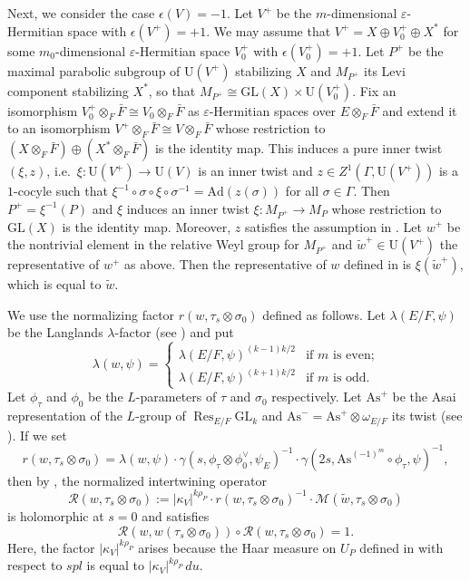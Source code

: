 \documentclass[11pt]{amsart}
\numberwithin{equation}{section}
\theoremstyle{plain}
\theoremstyle{definition}
\theoremstyle{remark}
\def\Res{\operatorname{Res}}
\def\Ad{\mathrm{Ad}}
\def\As{\mathrm{As}}
\def\GL{\mathrm{GL}}
\def\U{\mathrm{U}}
\def\spl{\boldsymbol{\mathit{spl}}}
\def\M{\mathcal{M}}
\def\R{\mathcal{R}}
\begin{document}
Next, we consider the case $\epsilon(V) = -1$.
Let $V^+$ be the $m$-dimensional $\varepsilon$-Hermitian space with $\epsilon(V^+) = +1$.
We may assume that $V^+ = X \oplus V_0^+ \oplus X^*$ for some $m_0$-dimensional $\varepsilon$-Hermitian space $V_0^+$ with $\epsilon(V_0^+) = +1$.
Let $P^+$ be the maximal parabolic subgroup of $\U(V^+)$ stabilizing $X$ and $M_{P^+}$ its Levi component stabilizing $X^*$, so that $M_{P^+} \cong \GL(X) \times \U(V_0^+)$.
Fix an isomorphism $V_0^+ \otimes_F \bar{F} \cong V_0 \otimes_F \bar{F}$ as $\varepsilon$-Hermitian spaces over $E \otimes_F \bar{F}$ and extend it to an isomorphism $V^+ \otimes_F \bar{F} \cong V \otimes_F \bar{F}$ whose restriction to $(X \otimes_F \bar{F}) \oplus (X^*\otimes_F \bar{F})$ is the identity map.
This induces a pure inner twist $(\xi, z)$, i.e.~$\xi : \U(V^+) \rightarrow \U(V)$ is an inner twist and $z \in Z^1(\Gamma, \U(V^+))$ is a $1$-cocyle such that $\xi^{-1} \circ \sigma \circ \xi \circ \sigma^{-1} = \Ad(z(\sigma))$ for all $\sigma \in \Gamma$.
Then $P^+ = \xi^{-1}(P)$ and $\xi$ induces an inner twist $\xi : M_{P^+} \rightarrow M_P$ whose restriction to $\GL(X)$ is the identity map.
Moreover, $z$ satisfies the assumption in \cite[\S 2.4.1]{kmsw}.
Let $w^+$ be the nontrivial element in the relative Weyl group for $M_{P^+}$ and $\tilde{w}^+ \in \U(V^+)$ the representative of $w^+$ as above.
Then the representative of $w$ defined in \cite[\S 2.3]{kmsw} is $\xi(\tilde{w}^+)$, which is equal to $\tilde{w}$.

We use the normalizing factor $r(w, \tau_s \otimes \sigma_0)$ defined as follows.
Let $\lambda(E/F, \psi)$ be the Langlands $\lambda$-factor (see \cite[\S 5]{deligne}) and put
\[
 \lambda(w, \psi) = 
 \begin{cases}
 \lambda(E/F, \psi)^{(k-1)k/2} & \text{if $m$ is even;} \\
 \lambda(E/F, \psi)^{(k+1)k/2} & \text{if $m$ is odd.}
 \end{cases}
\]
Let $\phi_\tau$ and $\phi_0$ be the $L$-parameters of $\tau$ and $\sigma_0$ respectively.
Let $\As^+$ be the Asai representation of the $L$-group of $\Res_{E/F} \GL_k$ and $\As^- = \As^+ \otimes \omega_{E/F}$ its twist (see \cite[\S 7]{ggp1}).
If we set 
\[
 r(w, \tau_s \otimes \sigma_0) = 
 \lambda(w, \psi) \cdot \gamma(s, \phi_\tau \otimes \phi_0^\vee, \psi_E)^{-1} \cdot \gamma(2s, \As^{(-1)^m} \circ \phi_\tau, \psi)^{-1},
\]
then by \cite[Lemmas 2.2.3 and 2.3.1]{kmsw}, the normalized intertwining operator
\[
 \R(w, \tau_s \otimes \sigma_0) := |\kappa_V|^{k \rho_P} \cdot r(w,\tau_s \otimes \sigma_0)^{-1} \cdot \M(\tilde{w}, \tau_s \otimes \sigma_0)
\]
is holomorphic at $s=0$ and satisfies
\[
 \R(w, w(\tau_s \otimes \sigma_0)) \circ \R(w, \tau_s \otimes \sigma_0) = 1.
\]
Here, the factor $|\kappa_V|^{k \rho_P}$ arises because the Haar measure on $U_P$ defined in \cite[\S 2.2]{kmsw} with respect to $\spl$ is equal to $|\kappa_V|^{k \rho_P} \, du$.
\end{document}
